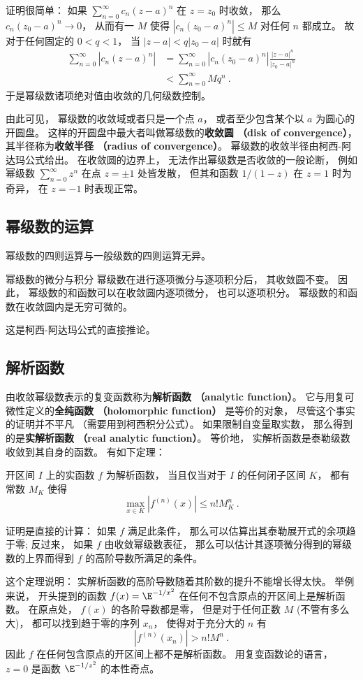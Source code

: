证明很简单： 如果 $\sum_{n=0}^\infty c_n(z-a)^n$ 在 $z=z_0$ 时收敛， 那么 $c_n(z_0-a)^n\to0$， 从而有一 $M$ 使得 $|c_n(z_0-a)^n|\leq M$ 对任何 $n$ 都成立。 故对于任何固定的 $0<q<1$， 当 $|z-a|<q|z_0-a|$ 时就有
$$
\begin{aligned}
\sum_{n=0}^\infty |c_n(z-a)^n|
&=\sum_{n=0}^\infty |c_n(z_0-a)^n|\frac{|z-a|^n}{|z_0-a|^n}\\
&<\sum_{n=0}^\infty Mq^n~.
\end{aligned}
$$
于是幂级数诸项绝对值由收敛的几何级数控制。

由此可见， 幂级数的收敛域或者只是一个点 $a$， 或者至少包含某个以 $a$ 为圆心的开圆盘。 这样的开圆盘中最大者叫做幂级数的\textbf{收敛圆 （disk of convergence）}， 其半径称为\textbf{收敛半径 （radius of convergence）}。 幂级数的收敛半径由柯西-阿达玛公式给出。 在收敛圆的边界上， 无法作出幂级数是否收敛的一般论断， 例如幂级数 $\sum_{n=0}^\infty z^n$ 在点 $z=\pm1$ 处皆发散， 但其和函数 $1/(1-z)$ 在 $z=1$ 时为奇异， 在 $z=-1$ 时表现正常。

\subsection{幂级数的运算}
幂级数的四则运算与一般级数的四则运算无异。

\begin{theorem}{幂级数的微分与积分}
幂级数在进行逐项微分与逐项积分后， 其收敛圆不变。 因此， 幂级数的和函数可以在收敛圆内逐项微分， 也可以逐项积分。 幂级数的和函数在收敛圆内是无穷可微的。
\end{theorem}
这是柯西-阿达玛公式的直接推论。 

\subsection{解析函数}
由收敛幂级数表示的复变函数称为\textbf{解析函数 （analytic function）}。 它与用复可微性定义的\textbf{全纯函数 （holomorphic function）} 是等价的对象， 尽管这个事实的证明并不平凡 （需要用到柯西积分公式）。 如果限制自变量取实数， 那么得到的是\textbf{实解析函数 （real analytic function）}。 等价地， 实解析函数是泰勒级数收敛到其自身的函数。 有如下定理：

\begin{theorem}{}
开区间 $I$ 上的实函数 $f$ 为解析函数， 当且仅当对于 $I$ 的任何闭子区间 $K$， 都有常数 $M_K$ 使得
$$
\max_{x\in K}|f^{(n)}(x)|\leq n!M_K^n~.
$$
\end{theorem}

证明是直接的计算： 如果 $f$ 满足此条件， 那么可以估算出其泰勒展开式的余项趋于零; 反过来， 如果 $f$ 由收敛幂级数表征， 那么可以估计其逐项微分得到的幂级数的上界而得到 $f$ 的高阶导数所满足的条件。

这个定理说明： 实解析函数的高阶导数随着其阶数的提升不能增长得太快。 举例来说， 开头提到的函数 $f(x)=\E^{-1/x^2}$ 在任何不包含原点的开区间上是解析函数。 在原点处， $f(x)$ 的各阶导数都是零， 但是对于任何正数 $M$ (不管有多么大)， 都可以找到趋于零的序列 $x_n$， 使得对于充分大的 $n$ 有
$$
|f^{(n)}(x_n)|>n!M^n~.
$$
因此 $f$ 在任何包含原点的开区间上都不是解析函数。 用复变函数论的语言， $z=0$ 是函数 $\E^{-1/z^2}$ 的本性奇点。

